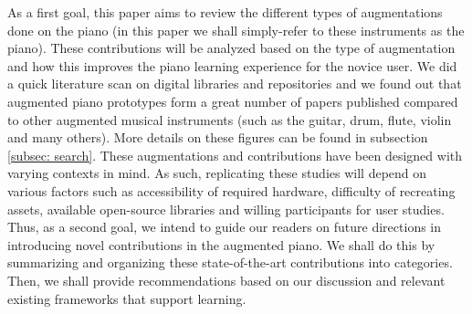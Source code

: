 \documentclass[sigchi, review]{acmart}
\begin{document}
As a first goal, this paper aims to review the different types of augmentations done on the piano (in this paper we shall simply-refer to these instruments as the piano). These contributions will be analyzed based on the type of augmentation and how this improves the piano learning experience for the novice user. We did a quick literature scan on digital libraries and repositories and we found out that augmented piano prototypes form a great number of papers published compared to other augmented musical instruments (such as the guitar, drum, flute, violin and many others). More details on these figures can be found in subsection \ref{subsec: search}. These augmentations and contributions have been designed with varying contexts in mind. As such, replicating these studies will depend on various factors such as accessibility of required hardware, difficulty of recreating assets, available open-source libraries and willing participants for user studies. Thus, as a second goal, we intend to guide our readers on future directions in introducing novel contributions in the augmented piano. We shall do this by summarizing and organizing these state-of-the-art contributions into categories. Then, we shall provide recommendations based on our discussion and relevant existing frameworks that support learning. 
\end{document}
